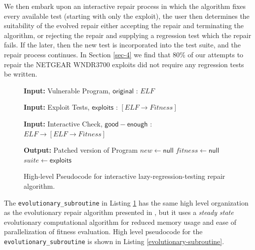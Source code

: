 \documentclass{sigcomm-alternate}
\begin{document}
We then embark upon an interactive repair process in which the
algorithm fixes every available test (starting with only the exploit),
the user then determines the suitability of the evolved repair either
accepting the repair and terminating the algorithm, or rejecting the
repair and supplying a regression test which the repair fails.  If the
later, then the new test is incorporated into the test suite, and the
repair process continues.  In Section \ref{sec-4} we find that 80\% of our
attempts to repair the NETGEAR WNDR3700 exploits did not require any
regression tests be written.

\begin{figure}[H]
\begin{algorithmic}[1]
\small
\item[{\textbf{Input: }} {Vulnerable Program, $\mathsf{original}$ : $ELF$}]
\item[{\textbf{Input: }} {Exploit Tests, $\mathsf{exploits}$ : $[ELF \rightarrow Fitness]$}]
\item[{\textbf{Input: }} {Interactive Check, $\mathsf{good-enough}$ : $ELF \rightarrow [ELF \rightarrow Fitness]$}]
\item[{\textbf{Output: }} {Patched version of Program}] 
   $new \leftarrow \mathsf{null}$ 
   $fitness \leftarrow \mathsf{null}$ 
   $suite \leftarrow \mathsf{exploits}$ 
\end{algorithmic}
\caption{\label{lazy-algorithm}High-level Pseudocode for interactive
lazy-regression-testing repair algorithm.}
\end{figure}

The \texttt{evolutionary\_subroutine} in Listing \ref{lazy-algorithm} has the same
high level organization as the evolutionary repair algorithm presented
in \cite{forrest2009genetic}, but it uses a \emph{steady state} evolutionary
computational algorithm \cite{Luke2013Metaheuristics} for reduced memory
usage and ease of parallelization of fitness evaluation.  High level
pseudocode for the \texttt{evolutionary\_subroutine} is shown in Listing
\ref{evolutionary-subroutine}.
\end{document}
